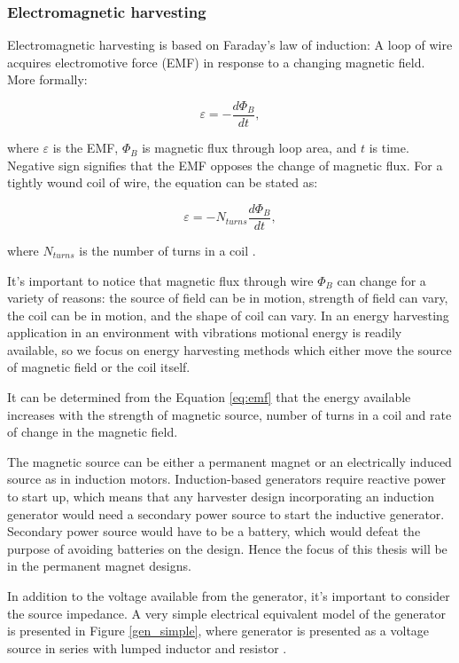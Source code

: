 \subsubsection{Electromagnetic harvesting} \label{sect:em_harvest}
Electromagnetic harvesting is based on Faraday's law of induction: A loop of wire acquires electromotive force (EMF) in response to a changing magnetic field. More formally:

\begin{equation}
  \varepsilon = - \frac{d \Phi_ {B}}{d t} , 
\end{equation}

where $\varepsilon$ is the EMF, $\Phi_{B}$ is magnetic flux through loop area, and $t$ is time. Negative sign signifies that the EMF opposes the change of magnetic flux. For a tightly wound coil of wire, the equation can be stated as: 

\begin{equation} \label{eq:emf}
  \varepsilon = -N_{turns} \frac{d \Phi_{B}}{d t} , 
\end{equation}

where $N_{turns}$ is the number of turns in a coil \cite[p.998]{universityphysics}.

It's important to notice that magnetic flux through wire $ \Phi_{B} $ can change for a variety of reasons: the source of field can be in motion, strength of field can vary, the coil can be in motion, and the shape of coil can vary. In an energy harvesting application in an environment with vibrations motional energy is readily available, so we focus on energy harvesting methods which either move the source of magnetic field or the coil itself.

It can be determined from the Equation \eqref{eq:emf} that the energy available increases with the strength of magnetic source, number of turns in a coil and rate of change in the magnetic field. 

The magnetic source can be either a permanent magnet or an electrically induced source as in induction motors. Induction-based generators require reactive power to start up, which means that any harvester design incorporating an induction generator would need a secondary power source to start the inductive generator. Secondary power source would have to be a battery, which would defeat the purpose of avoiding batteries on the design. Hence the focus of this thesis will be in the permanent magnet designs.

In addition to the voltage available from the generator, it's important to consider the source impedance. A very simple electrical equivalent model of the generator is presented in Figure \ref{gen_simple}, where generator is presented as a voltage source in series with lumped inductor and resistor \cite{Jirutitijaroen2012}. 


